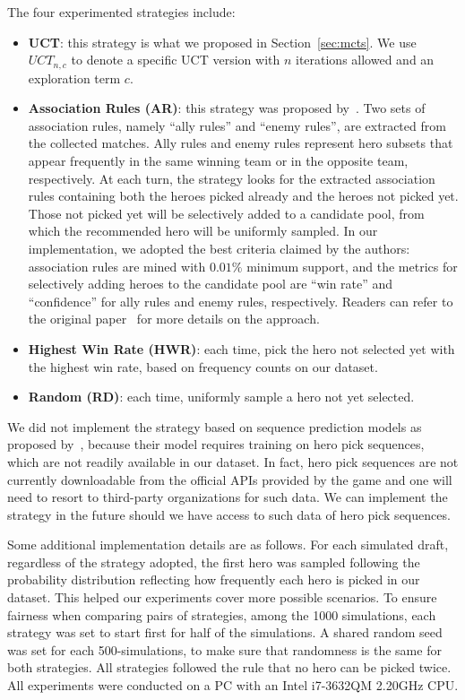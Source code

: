 The four experimented strategies include:
\begin{itemize}
\item \textbf{UCT}: this strategy is what we proposed in Section~\ref{sec:mcts}. We  use $UCT_{n,c}$ to denote a specific UCT version with $n$ iterations allowed and an exploration term $c$. 
\item \textbf{Association Rules (AR)}: this strategy was proposed by~\textcite{hanke2017reco}. Two sets of association rules, namely ``ally rules'' and ``enemy rules'', are extracted from the collected matches. Ally rules and enemy rules represent hero subsets that appear frequently in the same winning team or in the opposite team, respectively. At each turn, the strategy looks for the extracted association rules containing both the heroes picked already and the heroes not picked yet. Those not picked yet will be selectively added to a candidate pool, from which the recommended hero will be uniformly sampled. In our implementation, we adopted the best criteria claimed by the authors: association rules are mined with $0.01\%$ minimum support, and the metrics for selectively adding heroes to the candidate pool are ``win rate'' and ``confidence'' for ally rules and enemy rules, respectively. Readers can refer to the original paper~\cite{hanke2017reco} for more details on the approach. 
\item \textbf{Highest Win Rate (HWR)}: each time, pick the hero not selected yet with the highest win rate, based on frequency counts on our dataset. 
\item \textbf{Random (RD)}: each time, uniformly sample a hero not yet selected. 
\end{itemize}

We did not implement the strategy based on sequence prediction models as proposed by~\textcite{summerville2017reco}, because their model requires training on hero pick sequences, which are not readily available in our dataset. In fact, hero pick sequences are not currently downloadable from the official APIs provided by the game and one will need to resort to third-party organizations for such data. We can implement the strategy in the future should we have access to such data of hero pick sequences.

Some additional implementation details are as follows. For each simulated draft, regardless of the strategy adopted, the first hero was sampled following the probability distribution reflecting how frequently each hero is picked in our dataset. This helped our experiments cover more possible scenarios. To ensure fairness when comparing pairs of strategies, among the 1000 simulations, each strategy was set to start first for half of the simulations. A shared random seed was set for each 500-simulations, to make sure that randomness is the same for both strategies. All strategies followed the rule that no hero can be picked twice. All experiments were conducted on a PC with an Intel i7-3632QM 2.20GHz CPU.


